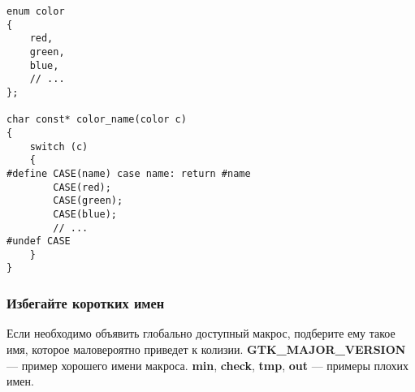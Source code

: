 \begin{verbatim}
enum color
{
    red,
    green,
    blue,
    // ...
};

char const* color_name(color c)
{
    switch (c)
    {
#define CASE(name) case name: return #name
        CASE(red);
        CASE(green);
        CASE(blue);
        // ...
#undef CASE
    }
}
\end{verbatim}

\subsubsection{Избегайте коротких имен}

Если необходимо объявить глобально доступный макрос, подберите ему такое имя, которое маловероятно приведет к колизии. {\bf GTK\_MAJOR\_VERSION} --- пример хорошего имени макроса. {\bf min}, {\bf check}, {\bf tmp}, {\bf out} --- примеры плохих имен.
